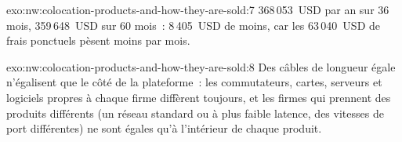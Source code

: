 \begin{solution}{exo:nw:colocation-products-and-how-they-are-sold:7}
368\,053~USD par an sur 36 mois, 359\,648~USD sur 60 mois~: 8\,405~USD de moins, car les 63\,040~USD de frais ponctuels pèsent moins par mois.
\end{solution}

\begin{solution}{exo:nw:colocation-products-and-how-they-are-sold:8}
Des câbles de longueur égale n'égalisent que le côté de la plateforme~: les commutateurs, cartes, serveurs et logiciels propres à chaque firme diffèrent toujours, et les firmes qui prennent
des produits différents (un réseau standard ou à plus faible latence, des vitesses de port différentes) ne sont égales qu'à l'intérieur de chaque produit.
\end{solution}

